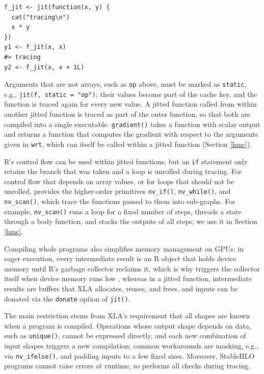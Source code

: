 \begin{verbatim}
f_jit <- jit(function(x, y) {
  cat("tracing\n")
  x * y
})
y1 <- f_jit(x, x)
#> tracing
y2 <- f_jit(x, x + 1L)
\end{verbatim}

Arguments that are not arrays, such as \texttt{op} above, must be marked as \texttt{static}, e.g., \texttt{jit(f,\ static\ =\ "op")}; their values become part of the cache key, and the function is traced again for every new value.
A jitted function called from within another jitted function is traced as part of the outer function, so that both are compiled into a single executable.
\texttt{gradient()} takes a function with scalar output and returns a function that computes the gradient with respect to the arguments given in \texttt{wrt}, which can itself be called within a jitted function (Section \ref{hmc}).

R's control flow can be used within jitted functions, but an \texttt{if} statement only retains the branch that was taken and a loop is unrolled during tracing.
For control flow that depends on array values, or for loops that should not be unrolled,  provides the higher-order primitives \texttt{nv\_if()}, \texttt{nv\_while()}, and \texttt{nv\_scan()}, which trace the functions passed to them into sub-graphs.
For example, \texttt{nv\_scan()} runs a loop for a fixed number of steps, threads a state through a body function, and stacks the outputs of all steps; we use it in Section \ref{hmc}.

Compiling whole programs also simplifies memory management on GPUs: in eager execution, every intermediate result is an R object that holds device memory until R's garbage collector reclaims it, which is why  triggers the collector itself when device memory runs low \citep{ref-torch-memory}, whereas in a jitted function, intermediate results are buffers that XLA allocates, reuses, and frees, and inputs can be donated via the \texttt{donate} option of \texttt{jit()}.

The main restriction stems from XLA's requirement that all shapes are known when a program is compiled.
Operations whose output shape depends on data, such as \texttt{unique()}, cannot be expressed directly, and each new combination of input shapes triggers a new compilation; common workarounds are masking, e.g., via \texttt{nv\_ifelse()}, and padding inputs to a few fixed sizes.
Moreover, StableHLO programs cannot raise errors at runtime, so  performs all checks during tracing.

